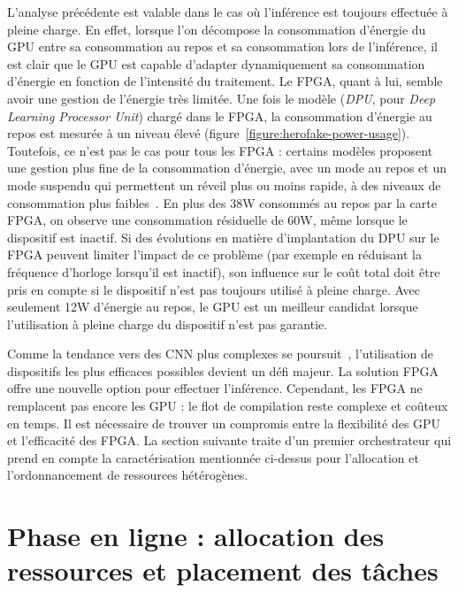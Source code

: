 L'analyse précédente est valable dans le cas où l'inférence est toujours effectuée à pleine charge. En effet, lorsque l'on décompose la consommation d'énergie du \gls{GPU} entre sa consommation au repos et sa consommation lors de l'inférence, il est clair que le \gls{GPU} est capable d'adapter dynamiquement sa consommation d'énergie en fonction de l'intensité du traitement. Le \gls{FPGA}, quant à lui, semble avoir une gestion de l'énergie très limitée. Une fois le modèle (\textit{DPU}, pour \textit{Deep Learning Processor Unit}) chargé dans le \gls{FPGA}, la consommation d'énergie au repos est mesurée à un niveau élevé (figure~\ref{figure:herofake-power-usage}). Toutefois, ce n'est pas le cas pour tous les \gls{FPGA} : certains modèles proposent une gestion plus fine de la consommation d'énergie, avec un mode au repos et un mode suspendu qui permettent un réveil plus ou moins rapide, à des niveaux de consommation plus faibles~\cite{shahzadInvestigatingEnergyConsumption}.
En plus des 38W consommés au repos par la carte \gls{FPGA}, on observe une consommation résiduelle de 60W, même lorsque le dispositif est inactif. Si des évolutions en matière d'implantation du DPU sur le \gls{FPGA} peuvent limiter l'impact de ce problème (par exemple en réduisant la fréquence d'horloge lorsqu'il est inactif), son influence sur le coût total doit être pris en compte si le dispositif n'est pas toujours utilisé à pleine charge. Avec seulement 12W d'énergie au repos, le \gls{GPU} est un meilleur candidat lorsque l'utilisation à pleine charge du dispositif n'est pas garantie.

Comme la tendance vers des \gls{CNN} plus complexes se poursuit~\cite{8807741}, l'utilisation de dispositifs les plus efficaces possibles devient un défi majeur. La solution \gls{FPGA} offre une nouvelle option pour effectuer l'inférence. Cependant, les \gls{FPGA} ne remplacent pas encore les \gls{GPU} : le flot de compilation reste complexe et coûteux en temps. Il est nécessaire de trouver un compromis entre la flexibilité des \gls{GPU} et l'efficacité des \gls{FPGA}. La section suivante traite d'un premier orchestrateur qui prend en compte la caractérisation mentionnée ci-dessus pour l'allocation et l'ordonnancement de ressources hétérogènes.

\section{Phase en ligne : allocation des ressources et placement des tâches}
\label{section:herofake-online}

